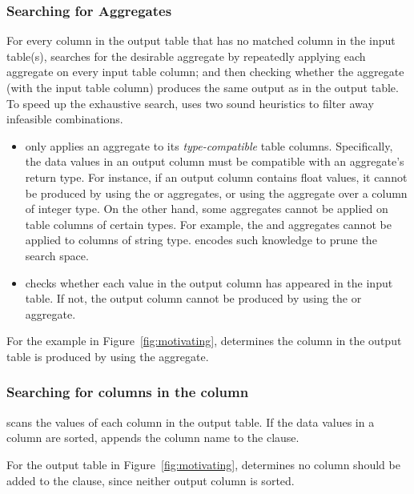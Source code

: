
\subsubsection{Searching for Aggregates}
\label{sec:agg_search}

For every column in the output table that has no matched
column in the input table(s),
\ourtool searches for the desirable aggregate by
repeatedly applying each aggregate on
every input table column; and then checking whether
the aggregate (with the input table column) produces the same output 
as in the output table. To speed up the exhaustive search,
\ourtool uses two sound heuristics to filter away infeasible
combinations.


\begin{itemize}
\item \ourtool only applies an aggregate
to its \textit{type-compatible} table columns. Specifically,
the data values in an output column must be compatible with an
aggregate's return type. For instance, if an output column
contains float values, it cannot be produced by using the 
or  aggregates, or 
using the  aggregate over a column of integer type.
On the other hand, some aggregates cannot be applied on
table columns of certain types. For example, the 
and  aggregates cannot be applied to columns of string type.
\ourtool encodes such knowledge to prune the search space.

\item \ourtool checks whether each value in the output
column has appeared in the input table. If not, the
output column cannot be produced by using
the  or  aggregate.
\end{itemize}

For the example in Figure~\ref{fig:motivating}, \ourtool
determines the  column in the output
table is produced by using the  aggregate.



\subsubsection{Searching for columns in the  column}
\label{sec:orderby}
\ourtool scans the values of each column in the output table. If
the data values in a column are sorted, \ourtool
appends the column name to the  clause.

For the output table in Figure~\ref{fig:motivating}, \ourtool
determines no column should be added to the  clause,
since neither output column is sorted.


